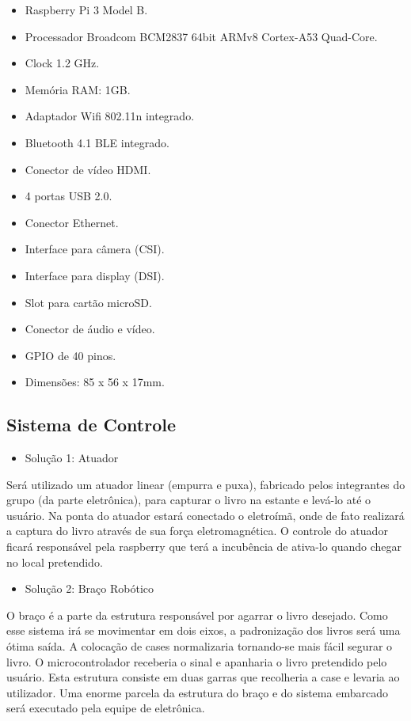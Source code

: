 \begin{itemize}
\item Raspberry Pi 3 Model B.
\item Processador Broadcom BCM2837 64bit ARMv8 Cortex-A53 Quad-Core.
\item Clock 1.2 GHz.
\item Memória RAM: 1GB.
\item Adaptador Wifi 802.11n integrado.
\item Bluetooth 4.1 BLE integrado.
\item Conector de vídeo HDMI.
\item 4 portas USB 2.0.
\item Conector Ethernet.
\item Interface para câmera (CSI).
\item Interface para display (DSI).
\item Slot para cartão microSD.
\item Conector de áudio e vídeo.
\item GPIO de 40 pinos.
\item Dimensões: 85 x 56 x 17mm.
\end{itemize}

\subsection{Sistema de Controle}

\begin{itemize}
\item{Solução 1: Atuador}
\end{itemize}

Será utilizado um atuador linear (empurra e puxa), fabricado pelos integrantes do grupo (da parte eletrônica), para capturar o livro na estante e levá-lo até o usuário. Na ponta do atuador estará conectado o eletroímã, onde de fato realizará a captura do livro através de sua força eletromagnética. O controle do atuador ficará responsável pela raspberry que terá a incubência de ativa-lo quando chegar no local pretendido. 

\begin{itemize}
\item{Solução 2: Braço Robótico}
\end{itemize}

O braço é a parte da estrutura responsável por agarrar o livro desejado. Como esse sistema irá se movimentar em dois eixos, a padronização dos livros será uma ótima saída. A colocação de cases normalizaria tornando-se mais fácil segurar o livro. O microcontrolador receberia o sinal e apanharia o livro pretendido pelo usuário. Esta estrutura consiste em duas garras que recolheria a case e levaria ao utilizador. Uma enorme parcela da estrutura do braço e do sistema embarcado será executado pela equipe de eletrônica. 

